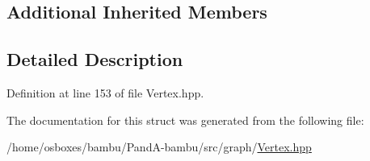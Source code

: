 \subsection*{Additional Inherited Members}


\subsection{Detailed Description}


Definition at line 153 of file Vertex.\+hpp.



The documentation for this struct was generated from the following file\+:\begin{DoxyCompactItemize}
\item 
/home/osboxes/bambu/\+Pand\+A-\/bambu/src/graph/\hyperlink{Vertex_8hpp}{Vertex.\+hpp}\end{DoxyCompactItemize}
